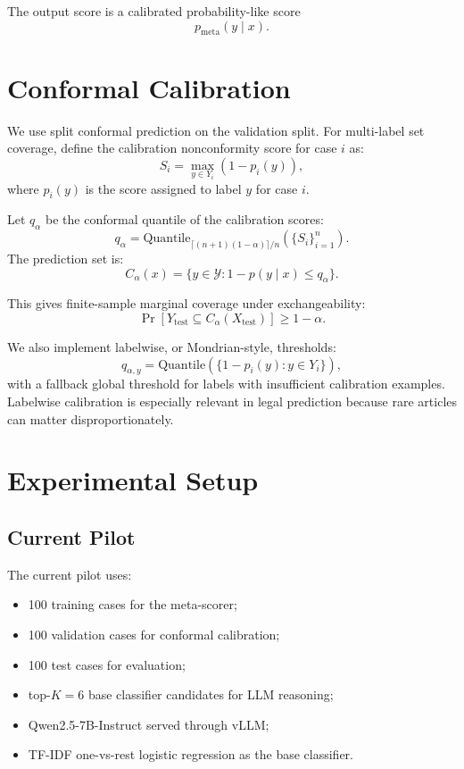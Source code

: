 \documentclass[11pt]{article}
\begin{document}
The output score is a calibrated probability-like score
\[
  p_{\mathrm{meta}}(y \mid x).
\]

\section{Conformal Calibration}

We use split conformal prediction on the validation split. For multi-label set coverage, define the calibration nonconformity score for case $i$ as:
\[
  S_i = \max_{y \in Y_i} \left(1 - p_i(y)\right),
\]
where $p_i(y)$ is the score assigned to label $y$ for case $i$.

Let $q_\alpha$ be the conformal quantile of the calibration scores:
\[
  q_\alpha = \mathrm{Quantile}_{\lceil(n+1)(1-\alpha)\rceil/n}(\{S_i\}_{i=1}^n).
\]
The prediction set is:
\[
  C_\alpha(x) = \{y \in \mathcal{Y}: 1 - p(y \mid x) \leq q_\alpha \}.
\]

This gives finite-sample marginal coverage under exchangeability:
\[
  \Pr[Y_{\mathrm{test}} \subseteq C_\alpha(X_{\mathrm{test}})] \geq 1-\alpha.
\]

We also implement labelwise, or Mondrian-style, thresholds:
\[
  q_{\alpha,y} = \mathrm{Quantile}(\{1-p_i(y): y \in Y_i\}),
\]
with a fallback global threshold for labels with insufficient calibration examples. Labelwise calibration is especially relevant in legal prediction because rare articles can matter disproportionately.

\section{Experimental Setup}

\subsection{Current Pilot}

The current pilot uses:
\begin{itemize}
  \item 100 training cases for the meta-scorer;
  \item 100 validation cases for conformal calibration;
  \item 100 test cases for evaluation;
  \item top-$K=6$ base classifier candidates for LLM reasoning;
  \item Qwen2.5-7B-Instruct served through vLLM;
  \item TF-IDF one-vs-rest logistic regression as the base classifier.
\end{itemize}
\end{document}
